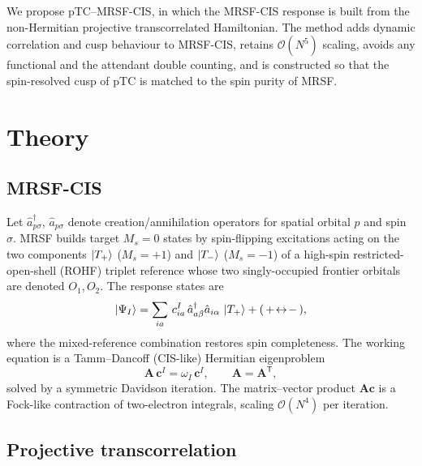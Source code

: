 \documentclass[aps,prb,reprint,superscriptaddress,floatfix]{revtex4-2}
\newcommand{\op}[1]{\hat{#1}}
\begin{document}
We propose pTC--MRSF-CIS, in which the MRSF-CIS response is built from the
non-Hermitian projective transcorrelated Hamiltonian. The method adds dynamic
correlation and cusp behaviour to MRSF-CIS, retains $\mathcal{O}(N^5)$ scaling,
avoids any functional and the attendant double counting, and is constructed so
that the spin-resolved cusp of pTC is matched to the spin purity of MRSF.

\section{Theory}

\subsection{MRSF-CIS}

Let $\op{a}^\dagger_{p\sigma}$, $\op{a}_{p\sigma}$ denote creation/annihilation
operators for spatial orbital $p$ and spin $\sigma$. MRSF builds target $M_s=0$
states by spin-flipping excitations acting on the two components
$\ket{T_{+}}$ ($M_s=+1$) and $\ket{T_{-}}$ ($M_s=-1$) of a high-spin
restricted-open-shell (ROHF) triplet reference whose two singly-occupied frontier
orbitals are denoted $O_1,O_2$. The response states are
\begin{equation}
\ket{\Psi_I}=\sum_{ia}\, c^{I}_{ia}\,
\op{a}^\dagger_{a\beta}\op{a}_{i\alpha}\,\ket{T_{+}}
+ (\,+\!\leftrightarrow\!-\,),
\end{equation}
where the mixed-reference combination restores spin completeness. The working
equation is a Tamm--Dancoff (CIS-like) Hermitian eigenproblem
\begin{equation}
\mathbf{A}\,\mathbf{c}^I=\omega_I\,\mathbf{c}^I,
\qquad \mathbf{A}=\mathbf{A}^{\mathsf{T}},
\label{eq:mrsf}
\end{equation}
solved by a symmetric Davidson iteration. The matrix--vector product
$\mathbf{A}\mathbf{c}$ is a Fock-like contraction of two-electron integrals,
scaling $\mathcal{O}(N^4)$ per iteration.

\subsection{Projective transcorrelation}
\end{document}
